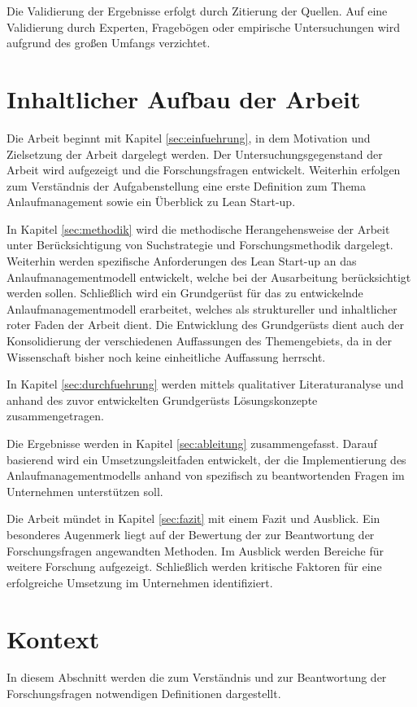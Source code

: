 Die Validierung der Ergebnisse erfolgt durch Zitierung der Quellen. Auf eine Validierung durch Experten, Fragebögen oder empirische Untersuchungen wird aufgrund des großen Umfangs verzichtet. 

\section{Inhaltlicher Aufbau der Arbeit}
Die Arbeit beginnt mit Kapitel \ref{sec:einfuehrung}, in dem Motivation und Zielsetzung der Arbeit dargelegt werden. Der Untersuchungsgegenstand der Arbeit wird aufgezeigt und die Forschungsfragen entwickelt. Weiterhin erfolgen zum Verständnis der Aufgabenstellung eine erste Definition zum Thema Anlaufmanagement sowie ein Überblick zu Lean Start-up.

In Kapitel \ref{sec:methodik} wird die methodische Herangehensweise der Arbeit unter Berücksichtigung von Suchstrategie und Forschungsmethodik dargelegt. 
Weiterhin werden spezifische Anforderungen des Lean Start-up an das Anlaufmanagementmodell entwickelt, welche bei der Ausarbeitung berücksichtigt werden sollen. Schließlich wird ein Grundgerüst für das zu entwickelnde Anlaufmanagementmodell erarbeitet, welches als struktureller und inhaltlicher roter Faden der Arbeit dient. 
Die Entwicklung des Grundgerüsts dient auch der Konsolidierung der verschiedenen Auffassungen des Themengebiets, da in der Wissenschaft bisher noch keine einheitliche Auffassung herrscht. 

In Kapitel \ref{sec:durchfuehrung} werden mittels qualitativer Literaturanalyse und anhand des zuvor entwickelten Grundgerüsts Lösungskonzepte zusammengetragen. 

Die Ergebnisse werden in Kapitel \ref{sec:ableitung} zusammengefasst. Darauf basierend wird ein Umsetzungsleitfaden entwickelt, der die Implementierung des Anlaufmanagementmodells anhand von spezifisch zu beantwortenden Fragen im Unternehmen unterstützen soll. 

Die Arbeit mündet in Kapitel \ref{sec:fazit} mit einem Fazit und Ausblick. Ein besonderes Augenmerk liegt auf der Bewertung der zur Beantwortung der Forschungsfragen angewandten Methoden. Im Ausblick werden Bereiche für weitere Forschung aufgezeigt. Schließlich werden kritische Faktoren für eine erfolgreiche Umsetzung im Unternehmen identifiziert. 

\section{Kontext}
In diesem Abschnitt werden die zum Verständnis und zur Beantwortung der Forschungsfragen notwendigen Definitionen dargestellt. 

